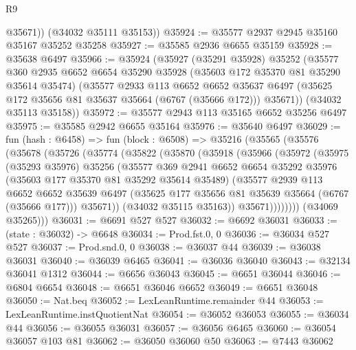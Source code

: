 \begin{lexlean}{R9}
\begin{coremodule}
          @35671))
      (@34032 @35111 @35153))
@35924 := @35577 @2937 @2945 @35160 @35167 @35252 @35258
@35927 := @35585 @2936 @6655 @35159
@35928 := @35638 @6497
@35966 := @35924
    (@35927
      (@35291 @35928)
      @35252
      (@35577
        @360
        @2935
        @6652
        @6654
        @35290
        @35928
        (@35603 @172 @35370 @81 @35290 @35614 @35474)
        (@35577
          @2933
          @113
          @6652
          @6652
          @35637
          @6497
          (@35625 @172 @35656 @81 @35637 @35664 (@6767 (@35666 @172)))
          @35671))
      (@34032 @35113 @35158))
@35972 := @35577 @2943 @113 @35165 @6652 @35256 @6497
@35975 := @35585 @2942 @6655 @35164
@35976 := @35640 @6497
@36029 := fun (hash : @6458) =>
  fun (block : @6508) =>
  @35216
    (@35565
      (@35576
        (@35678
          (@35726
            (@35774
              (@35822
                (@35870
                  (@35918
                    (@35966
                      (@35972
                        (@35975
                          (@35293 @35976)
                          @35256
                          (@35577
                            @369
                            @2941
                            @6652
                            @6654
                            @35292
                            @35976
                            (@35603 @177 @35370 @81 @35292 @35614 @35489)
                            (@35577
                              @2939
                              @113
                              @6652
                              @6652
                              @35639
                              @6497
                              (@35625 @177 @35656 @81 @35639 @35664 (@6767 (@35666 @177)))
                              @35671))
                          (@34032 @35115 @35163))
                        @35671))))))))
        (@34069 @35265)))
@36031 := @6691 @527 @527
@36032 := @6692 @36031
@36033 := (state : @36032) -> @6648
@36034 := Prod.fst.{0, 0}
@36036 := @36034 @527 @527
@36037 := Prod.snd.{0, 0}
@36038 := @36037 @44
@36039 := @36038 @36031
@36040 := @36039 @6465
@36041 := @36036 @36040
@36043 := @32134 @36041 @1312
@36044 := @6656 @36043
@36045 := @6651 @36044
@36046 := @6804 @6654
@36048 := @6651 @36046 @6652
@36049 := @6651 @36048
@36050 := Nat.beq
@36052 := LexLeanRuntime.remainder @44
@36053 := LexLeanRuntime.instQuotientNat
@36054 := @36052 @36053
@36055 := @36034 @44
@36056 := @36055 @36031
@36057 := @36056 @6465
@36060 := @36054 @36057 @103 @81
@36062 := @36050 @36060 @50
@36063 := @7443 @36062

\end{coremodule}
\end{lexlean}
